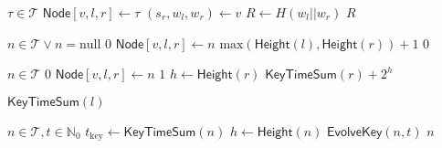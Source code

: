 \documentclass{article}
\begin{document}
\begin{algorithm}
\caption{$\mathsf{VerificationKeySum}: \tau \to \{0,1\}^\ell  $}\label{alg:VerificationKeySum}
\begin{algorithmic}[1]
\Require $\tau \in \mathcal{T}$
\State $\mathsf{\hyperref[def:Node]{Node}}[v,l,r] \gets \tau$
\State $(s_r,w_l,w_r)\gets v$
\State $R \gets H(w_l || w_r)$
\State \Return $R$
\end{algorithmic}
\end{algorithm}

\begin{algorithm}
\caption{$\mathsf{Height}: n \to \mathbb{N}_0  $}\label{alg:Height}
\begin{algorithmic}[1]
\Require $n\in \mathcal{T} \vee n = \mathrm{null}$
        \State \Return $0$
    \Else
        \State $\mathsf{\hyperref[def:Node]{Node}}[v,l,r] \gets n$
        \State \Return $\mathrm{max}(\mathsf{\hyperref[alg:Height]{Height}}(l),\mathsf{\hyperref[alg:Height]{Height}}(r)) + 1$
    \EndIf
\Else
    \State \Return $0$
\EndIf
\end{algorithmic}
\end{algorithm}

\begin{algorithm}
\caption{$\mathsf{KeyTimeSum}: n \to \mathbb{N}_0  $}\label{alg:KeyTimeSum}
\begin{algorithmic}[1]
\Require $n\in \mathcal{T}$
    \State \Return $0$
\Else
    \State $\mathsf{\hyperref[def:Node]{Node}}[v,l,r] \gets n$
            \State \Return $1$
        \Else
            \State $h\gets \mathsf{\hyperref[alg:Height]{Height}}(r)$
            \State \Return $\mathsf{\hyperref[alg:KeyTimeSum]{KeyTimeSum}}(r) + 2^h$
        \EndIf
        
    \Else
        \State \Return $\mathsf{\hyperref[alg:KeyTimeSum]{KeyTimeSum}}(l)$
    \EndIf
\EndIf


\end{algorithmic}
\end{algorithm}

\begin{algorithm}
\caption{$\mathsf{KeyUpdateSum}: n,t \to \mathsf{\hyperref[def:Node]{Node}}  $}\label{alg:KeyUpdateSum}
\begin{algorithmic}[1]
\Require $n\in \mathcal{T}, t\in \mathbb{N}_0$
\State $t_\mathrm{key} \gets \mathsf{\hyperref[alg:KeyTimeSum]{KeyTimeSum}}(n)$
\State $h\gets \mathsf{\hyperref[alg:Height]{Height}}(n)$
    \State \Return $\mathsf{\hyperref[alg:EvolveKey]{EvolveKey}}(n,t)$
\Else
    \State \Return $n$
\EndIf
\end{algorithmic}
\end{algorithm}
\end{document}
